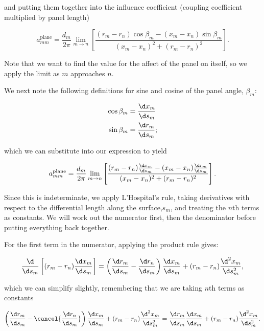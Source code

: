 \noindent and putting them together into the influence coefficient (coupling coefficient multiplied by panel length)

\begin{equation}
    a^\text{plane}_{mm} = \frac{d_m}{2 \pi} \lim_{m\rightarrow n} \left[\frac{(r_m - r_n)\cos \beta_m  - (x_m - x_n)\sin \beta_m}{(x_m - x_n)^2+(r_m - r_n)^2}\right].
\end{equation}

\noindent Note that we want to find the value for the affect of the panel on itself, so we apply the limit as \(m\) approaches \(n\).

We next note the following definitions for sine and cosine of the panel angle, \(\beta_m\):

\begin{align}
    \cos \beta_m  &= \frac{\d x_m}{\d s_m} \\
    \sin \beta_m  &= \frac{\d r_m}{\d s_m};
\end{align}

\noindent which we can substitute into our expression to yield

\begin{equation}
    a^\text{plane}_{mm} = \frac{d_m}{2 \pi} \lim_{m\rightarrow n} \left[\frac{(r_m - r_n) \frac{\d x_m}{\d s_m}  - (x_m - x_n)\frac{\d r_m}{\d s_m}}{(x_m - x_n)^2+(r_m - r_n)^2}\right].
\end{equation}

Since this is indeterminate, we apply L'Hospital's rule, taking derivatives with respect to the differential length along the surface,\(s_m\), and treating the \(n\)th terms as constants.
We will work out the numerator first, then the denominator before putting everything back together.

For the first term in the numerator, applying the product rule gives:

\begin{equation}
    \frac{\d}{\d s_m} \left[ (r_m-r_n)\frac{\d x_m}{\d s_m}\right] = \left(\frac{\d r_m}{\d s_m} - \frac{\d r_n}{\d s_m} \right) \frac{\d x_m}{\d s_m} + (r_m-r_n)\frac{\d^2 x_m}{\d s_m^2},
\end{equation}

\noindent which we can simplify slightly, remembering that we are taking \(n\)th terms as constants

\begin{equation}
 \left(\frac{\d r_m}{\d s_m} - \cancel{\frac{\d r_n}{\d s_m}} \right) \frac{\d x_m}{\d s_m} + (r_m-r_n)\frac{\d^2 x_m}{\d s_m^2} =  \frac{\d r_m}{\d s_m} \frac{\d x_m}{\d s_m} + (r_m-r_n)\frac{\d^2 x_m}{\d s_m^2}.
\end{equation}

